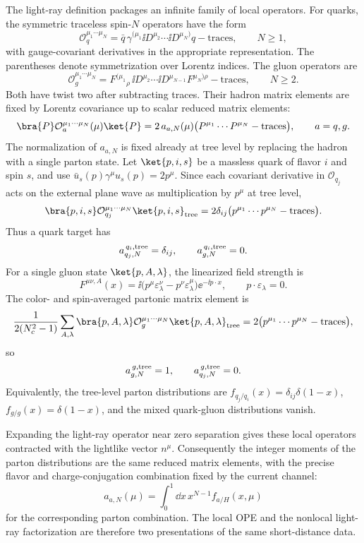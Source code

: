 The light-ray definition packages an infinite family of local operators.  For
quarks, the symmetric traceless spin-\(N\) operators have the form
\[
  \mathcal O_{q}^{\mu_1\cdots\mu_N}
  =
  \bar q\,
  \gamma^{(\mu_1}
  \ii D^{\mu_2}\cdots \ii D^{\mu_N)}
  q
  -
  \text{traces},
  \qquad N\ge1,
\]
with gauge-covariant derivatives in the appropriate representation.  The
parentheses denote symmetrization over Lorentz indices.  The gluon operators
are
\[
  \mathcal O_{g}^{\mu_1\cdots\mu_N}
  =
  F^{(\mu_1}{}_{\rho}\,
  \ii D^{\mu_2}\cdots\ii D^{\mu_{N-1}}
  F^{\mu_N)\rho}
  -
  \text{traces},
  \qquad N\ge2 .
\]
Both have twist two after subtracting traces.  Their hadron matrix elements
are fixed by Lorentz covariance up to scalar reduced matrix elements:
\[
  \bra{P}\mathcal O_{a}^{\mu_1\cdots\mu_N}(\mu)\ket{P}
  =
  2\,a_{a,N}(\mu)
  \bigl(P^{\mu_1}\cdots P^{\mu_N}-\text{traces}\bigr),
  \qquad a=q,g .
\]
The normalization of \(a_{a,N}\) is fixed already at tree level by replacing
the hadron with a single parton state.  Let
\(\ket{p,i,s}\) be a massless quark of flavor \(i\) and spin \(s\), and use
\(\bar u_s(p)\gamma^\mu u_s(p)=2p^\mu\).  Since each covariant derivative in
\(\mathcal O_{q_j}\) acts on the external plane wave as multiplication by
\(p^\mu\) at tree level,
\[
  \bra{p,i,s}\mathcal O_{q_j}^{\mu_1\cdots\mu_N}\ket{p,i,s}_{\rm tree}
  =
  2\delta_{ij}
  \bigl(p^{\mu_1}\cdots p^{\mu_N}-\text{traces}\bigr).
\]
Thus a quark target has
\[
  a_{q_j,N}^{\,q_i,{\rm tree}}=\delta_{ij},
  \qquad
  a_{g,N}^{\,q_i,{\rm tree}}=0 .
\]
For a single gluon state \(\ket{p,A,\lambda}\), the linearized field strength
is
\[
  F^{\mu\nu,A}(x)
  =
  \ii\bigl(p^\mu\varepsilon^\nu_\lambda
  -p^\nu\varepsilon^\mu_\lambda\bigr)\ee^{-\ii p\cdot x},
  \qquad
  p\cdot\varepsilon_\lambda=0 .
\]
The color- and spin-averaged partonic matrix element is
\[
  \frac{1}{2(N_c^2-1)}
  \sum_{A,\lambda}
  \bra{p,A,\lambda}\mathcal O_{g}^{\mu_1\cdots\mu_N}
  \ket{p,A,\lambda}_{\rm tree}
  =
  2
  \bigl(p^{\mu_1}\cdots p^{\mu_N}-\text{traces}\bigr),
\]
so
\[
  a_{g,N}^{\,g,{\rm tree}}=1,
  \qquad
  a_{q_j,N}^{\,g,{\rm tree}}=0 .
\]
Equivalently, the tree-level parton distributions are
\(f_{q_j/q_i}(x)=\delta_{ij}\delta(1-x)\),
\(f_{g/g}(x)=\delta(1-x)\), and the mixed quark-gluon distributions vanish.

Expanding the light-ray operator near zero separation gives these local
operators contracted with the lightlike vector \(n^\mu\).  Consequently the
integer moments of the parton distributions are the same reduced matrix
elements, with the precise flavor and charge-conjugation combination fixed by
the current channel:
\[
  a_{a,N}(\mu)
  =
  \int_0^1 \dd x\,x^{N-1} f_{a/H}(x,\mu)
\]
for the corresponding parton combination.  The local OPE and the nonlocal
light-ray factorization are therefore two presentations of the same
short-distance data.

